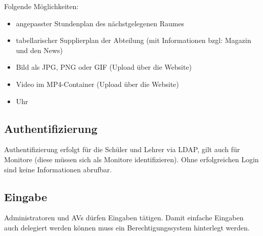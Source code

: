 Folgende Möglichkeiten:
\begin{itemize}
	\item 
		angepasster Stundenplan des nächstgelegenen Raumes
	\item
		tabellarischer Supplierplan der Abteilung (mit Informationen bzgl: Magazin und den News)
	\item
		Bild als JPG, PNG oder GIF (Upload über die Website)
	\item
		Video im MP4-Container (Upload über die Website)
	\item
		Uhr
\end{itemize}

\subsection{Authentifizierung}
Authentifizierung erfolgt für die Schüler und Lehrer via LDAP, gilt auch für Monitore (diese müssen sich als Monitore identifizieren). Ohne erfolgreichen Login sind keine Informationen abrufbar.

\subsection{Eingabe}
Administratoren und AVs dürfen Eingaben tätigen. Damit einfache Eingaben auch delegiert werden können muss ein Berechtigungssystem hinterlegt werden.

